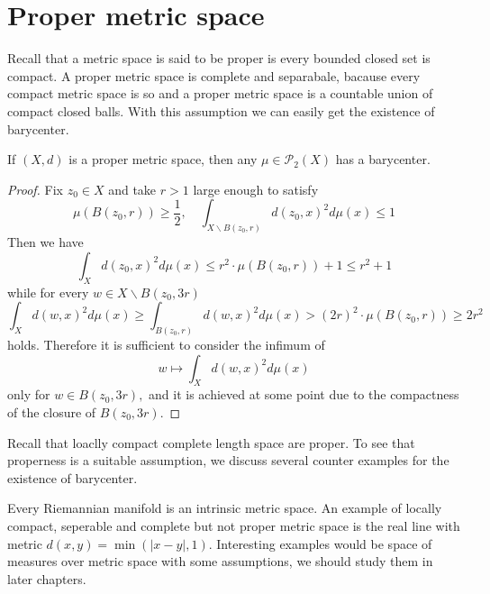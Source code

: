 \chapter{Proper metric space}

Recall that a metric space is said to be proper is every bounded closed set is compact. A proper metric space is complete and separabale, bacause every compact metric space is so and a proper metric space is a countable union of compact closed balls. With this assumption we can easily get the existence of barycenter.

\begin{lem}
	\label{lem:existence_proper_space}
	If \( ( X , d ) \) is a proper metric space, then any \( \mu \in \mathcal { P } _ { 2 } ( X ) \) has a barycenter.
\end{lem}

\begin{proof}
	Fix \( z _ { 0 } \in X \) and take \( r > 1 \) large enough to satisfy
	\[ \mu \left( B \left( z _ { 0 } , r \right) \right) \geq \frac { 1 } { 2 } , \quad \int _ { X \backslash B \left( z _ { 0 } , r \right) } d \left( z _ { 0 } , x \right) ^ { 2 } d \mu ( x ) \leq 1 \]
	Then we have
	\[ \int _ { X } d \left( z _ { 0 } , x \right) ^ { 2 } d \mu ( x ) \leq r ^ { 2 } \cdot \mu \left( B \left( z _ { 0 } , r \right) \right) + 1 \leq r ^ { 2 } + 1 \]
	while for every \( w \in X \backslash B \left( z _ { 0 } , 3 r \right) \)
	\[ \int _ { X } d ( w , x ) ^ { 2 } d \mu ( x ) \geq \int _ { B \left( z _ { 0 } , r \right) } d ( w , x ) ^ { 2 } d \mu ( x ) > ( 2 r ) ^ { 2 } \cdot \mu \left( B \left( z _ { 0 } , r \right) \right) \geq 2 r ^ { 2 } \]
	holds. Therefore it is sufficient to consider the infimum of
	\[ w \longmapsto \int _ { X } d ( w , x ) ^ { 2 } d \mu ( x ) \]
	only for \( w \in B \left( z _ { 0 } , 3 r \right) , \) and it is achieved at some point due to the compactness of the closure of \( B \left( z _ { 0 } , 3 r \right) . \)
\end{proof}

Recall that loaclly compact complete length space are proper. To see that properness is a suitable assumption, we discuss several counter examples for the existence of barycenter.

Every Riemannian manifold is an intrinsic metric space. An example of locally compact, seperable and complete but not proper metric space is the real line with metric $d(x,y)=\min(|x-y|,1)$. Interesting examples would be space of measures over metric space with some assumptions, we should study them in later chapters.

